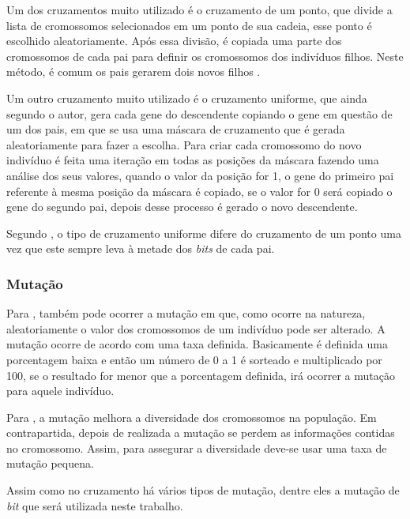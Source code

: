 \par Um dos cruzamentos muito utilizado é o cruzamento de um ponto, que divide a
lista de cromossomos selecionados em um ponto de sua cadeia, esse ponto é escolhido aleatoriamente.
Após essa divisão, é copiada uma parte dos cromossomos de cada pai para definir
os cromossomos dos indivíduos filhos. Neste método, é comum os pais gerarem dois
novos filhos \cite{REVISTA_MULTIDISCIPLINAR_DA_UNIESP}.

\par Um outro cruzamento muito utilizado é o cruzamento uniforme, que
ainda segundo o autor, gera cada gene do descendente copiando o gene em questão
de um dos pais, em que se usa uma máscara de cruzamento que é gerada aleatoriamente para fazer a escolha.
Para criar cada cromossomo do novo indivíduo é feita uma iteração em todas as
posições da máscara fazendo uma análise dos seus valores, quando o valor da posição for 1, o gene do
primeiro pai referente à mesma posição da máscara é copiado, se o valor for 0
será copiado o gene do segundo pai, depois desse processo é gerado o novo
descendente.

\par Segundo , o tipo de cruzamento
uniforme difere do cruzamento de um ponto uma vez que este sempre leva à
metade dos \textit{bits} de cada pai.

\subsubsection{Mutação}

\par Para , também pode ocorrer a mutação em
que, como ocorre na natureza, aleatoriamente o valor dos
cromossomos de um indivíduo pode ser alterado. A mutação ocorre de acordo com
uma taxa definida. Basicamente é definida uma porcentagem baixa e então um
número de 0 a 1 é sorteado e multiplicado por 100, se o resultado for menor que
a porcentagem definida, irá ocorrer a mutação para aquele indivíduo.

\par Para , a mutação melhora a
diversidade dos cromossomos na população. Em contrapartida, depois de realizada
a mutação se perdem as informações contidas no cromossomo. Assim, para assegurar
a diversidade deve-se usar uma taxa de mutação pequena. 


\par Assim como no cruzamento há vários tipos de mutação, dentre eles a mutação
de \textit{bit} que será utilizada neste trabalho.

